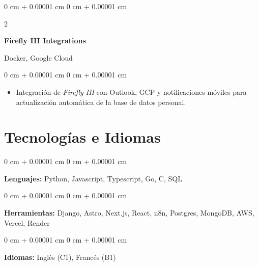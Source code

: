 \documentclass[10pt, letterpaper]{article}
\newenvironment{highlights}{
    \begin{itemize}[
        topsep=0.10 cm,
        parsep=0.10 cm,
        partopsep=0pt,
        itemsep=0pt,
        leftmargin=0 cm + 10pt
    ]
}{
    \end{itemize}
} %
\newenvironment{onecolentry}{
    \begin{adjustwidth}{
        0 cm + 0.00001 cm
    }{
        0 cm + 0.00001 cm
    }
}{
    \end{adjustwidth}
} %
\newenvironment{twocolentry}[2][]{
    \onecolentry
    \def\secondColumn{#2}
    \setcolumnwidth{\fill, 4.5 cm}
    \begin{paracol}{2}
}{
    \switchcolumn \raggedleft \secondColumn
    \end{paracol}
    \endonecolentry
} %
\begin{document}
    \begin{twocolentry}{Docker, Google Cloud}
        \textbf{Firefly III Integrations}
    \end{twocolentry}
    \vspace{0.10 cm}
    \begin{onecolentry}
        \begin{highlights}
            \item Integración de \textit{Firefly III} con Outlook, GCP y notificaciones móviles para actualización automática de la base de datos personal.
        \end{highlights}
    \end{onecolentry}

    \section{Tecnologías e Idiomas}

    \begin{onecolentry}
        \textbf{Lenguajes:} Python, Javascript, Typescript, Go, C, SQL
    \end{onecolentry}
    \vspace{0.1 cm}
    \begin{onecolentry}
        \textbf{Herramientas:} Django, Astro, Next.js, React, n8n, Postgres, MongoDB, AWS, Vercel, Render
    \end{onecolentry}
    \vspace{0.1 cm}
    \begin{onecolentry}
        \textbf{Idiomas:} Inglés (C1), Francés (B1)
    \end{onecolentry}
\end{document}
